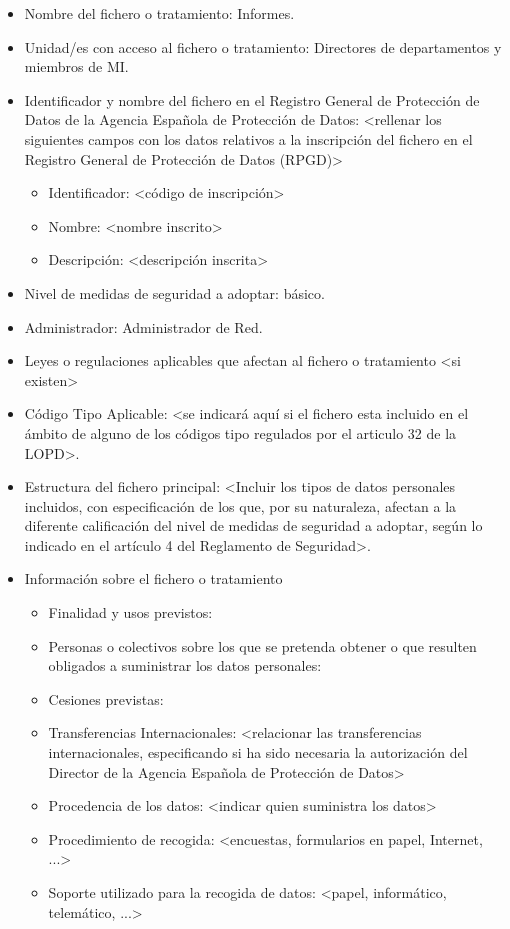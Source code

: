 \documentclass[a4paper,11pt,bibtotoc,noliststotoc]{scrbook}
\begin{document}
\begin{itemize}
\item Nombre del fichero o tratamiento: Informes.

\item Unidad/es con acceso al fichero o tratamiento: Directores de departamentos y miembros de MI.

\item Identificador y nombre del fichero en el Registro General de Protección de Datos de la Agencia Española de Protección de Datos: <rellenar los siguientes campos con los datos relativos a la inscripción del fichero en el Registro General de Protección de Datos (RPGD)>
	\begin{itemize}
	\item Identificador: <código de inscripción>
	\item Nombre: <nombre inscrito>
	\item Descripción: <descripción inscrita>
	\end{itemize}

\item Nivel de medidas de seguridad a adoptar: básico.

\item Administrador: Administrador de Red.

\item Leyes o regulaciones aplicables que afectan al fichero o tratamiento <si existen>

\item Código Tipo Aplicable: <se indicará aquí si el fichero esta incluido en el ámbito de alguno de los códigos tipo regulados por el articulo 32 de la LOPD>.

\item Estructura del fichero principal: <Incluir los tipos de datos personales incluidos, con especificación de los que, por su naturaleza, afectan a la diferente calificación del nivel de medidas de seguridad a adoptar, según lo indicado en el artículo 4 del Reglamento de Seguridad>.

\item Información sobre el fichero o tratamiento
	\begin{itemize}
	\item Finalidad y usos previstos:
	\item Personas o colectivos sobre los que se pretenda obtener o que resulten obligados a suministrar los datos personales:
	\item Cesiones previstas:
	\item Transferencias Internacionales: <relacionar las transferencias internacionales, especificando si ha sido necesaria la autorización del Director de la Agencia Española de Protección de Datos>
	\item Procedencia de los datos: <indicar quien suministra los datos>
	\item Procedimiento de recogida: <encuestas, formularios en papel, Internet, ...>
	\item Soporte utilizado para la recogida de datos: <papel, informático, telemático, ...>
	\end{itemize}


\end{itemize}
\end{document}
